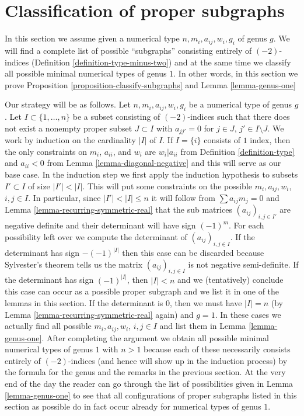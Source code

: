 \section{Classification of proper subgraphs}
\label{section-classify-proper-subgraphs}

\noindent
In this section we assume given a numerical type
$n, m_i, a_{ij}, w_i, g_i$ of genus $g$. We will find
a complete list of possible ``subgraphs'' consisting entirely
of $(-2)$-indices (Definition \ref{definition-type-minus-two}) and
at the same time we classify all possible minimal numerical
types of genus $1$. In other words, in this section we prove
Proposition \ref{proposition-classify-subgraphs} and
Lemma \ref{lemma-genus-one}

\medskip\noindent
Our strategy will be as follows. Let $n, m_i, a_{ij}, w_i, g_i$
be a numerical type of genus $g$. Let $I \subset \{1, \ldots, n\}$ be a subset
consisting of $(-2)$-indices such that there does not exist a nonempty proper
subset $J \subset I$ with $a_{jj'} = 0$ for $j \in J$, $j' \in I \setminus J$.
We work by induction on the cardinality $|I|$ of $I$. If $I = \{i\}$
consists of $1$ index, then the only constraints on $m_i$, $a_{ii}$,
and $w_i$ are $w_i | a_{ii}$ from Definition \ref{definition-type}
and $a_{ii} < 0$ from Lemma \ref{lemma-diagonal-negative}
and this will serve as our base case. In the induction step
we first apply the induction hypothesis to subsets $I' \subset I$
of size $|I'| < |I|$. This will put some constraints on the possible
$m_i, a_{ij}, w_i$, $i, j \in I$. In particular, since $|I'| < |I| \leq n$
it will follow from $\sum a_{ij}m_j = 0$ and
Lemma \ref{lemma-recurring-symmetric-real} that the
sub matrices $(a_{ij})_{i, j \in I'}$ are negative definite
and their determinant will have sign $(-1)^m$.
For each possibility left over we compute the determinant of
$(a_{ij})_{i, j \in I}$. If the determinant has sign $-(-1)^{|I|}$
then this case can be discarded because Sylvester's theorem tells
us the matrix $(a_{ij})_{i, j \in I}$ is not negative semi-definite.
If the determinant has sign $(-1)^{|I|}$, then $|I| < n$ and we
(tentatively) conclude this case can occur as a possible proper subgraph
and we list it in one of the lemmas in this section.
If the determinant is $0$, then we must have $|I| = n$
(by Lemma \ref{lemma-recurring-symmetric-real} again) and $g = 1$.
In these cases we actually find all possible $m_i, a_{ij}, w_i$, $i, j \in I$
and list them in Lemma \ref{lemma-genus-one}. After completing the
argument we obtain all possible minimal numerical types of genus
$1$ with $n > 1$ because each of these necessarily consists entirely
of $(-2)$-indices (and hence will show up in the induction process)
by the formula for the genus and the remarks in the previous section.
At the very end of the day the reader can go through the list of
possibilities given in Lemma \ref{lemma-genus-one} to see that all
configurations of proper subgraphs listed in this section as possible
do in fact occur already for numerical types of genus $1$.

